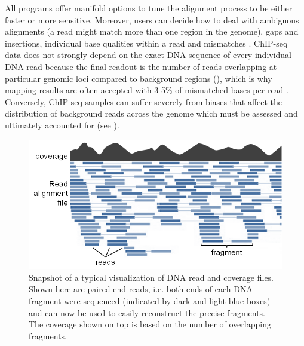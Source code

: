 All programs offer manifold options to tune the alignment process to be either faster or more sensitive. Moreover, users can decide how to deal with ambiguous alignments (a read might match more than one region in the genome), gaps and insertions, individual base qualities within a read and mismatches \citep{Langmead2009, Langmead2012}. ChIP-seq data does not strongly depend on the exact DNA sequence of every individual DNA read because the final readout is the number of reads overlapping at particular genomic loci compared to background regions (), which is why mapping results are often accepted with 3-5\% of mismatched bases per read \citep{Bardet2012}. Conversely, ChIP-seq samples can suffer severely from biases that affect the distribution of background reads across the genome which must be assessed and ultimately accounted for \citep{Liu2010, Cheung2011, Benjamini2012} (see ). 
\begin{figure}[tb]
 \begin{minipage}[c]{0.6\textwidth}
   \includegraphics[width=\textwidth]{Figures/CoverageAndReads.png}
 \end{minipage}\hfill
 \begin{minipage}[c]{0.37\textwidth}
	\begin{footnotesize}
   \caption[Snapshot of a typical visualization of DNA read and coverage files.]{\textsf{Snapshot of a typical visualization of DNA read and coverage files. Shown here are paired-end reads, i.e. both ends of each DNA frag\-ment were sequenced (indicated by dark and light blue boxes) and can now be used to easily reconstruct the precise frag\-ments. The coverage shown on top is based on the number of overlapping fragments.}}
\label{fig:readsCoverages}
\end{footnotesize}
 \end{minipage}
\end{figure}
